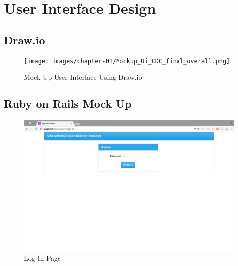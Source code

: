\chapter{User Interface Design}

    \section{Draw.io}
        \FloatBarrier
            \begin{figure}[h!]
                \centering
                    \texttt{[image: images/chapter-01/Mockup\_Ui\_CDC\_final\_overall.png]}
                	\caption{Mock Up User Interface Using Draw.io}
                	\label{fig_mock_draw_io}
            \end{figure}
        \FloatBarrier
        
    \section{Ruby on Rails Mock Up} \label{ruby_on_rails_mock_up}
            \FloatBarrier
                \begin{figure}[h!]
                    \centering
                        \includegraphics[width=12cm]{images/chapter-01/mockup_rails/log_in.png}
                    	\caption{Log-In Page}
                    	\label{log_in}
                \end{figure}
            \FloatBarrier
            
